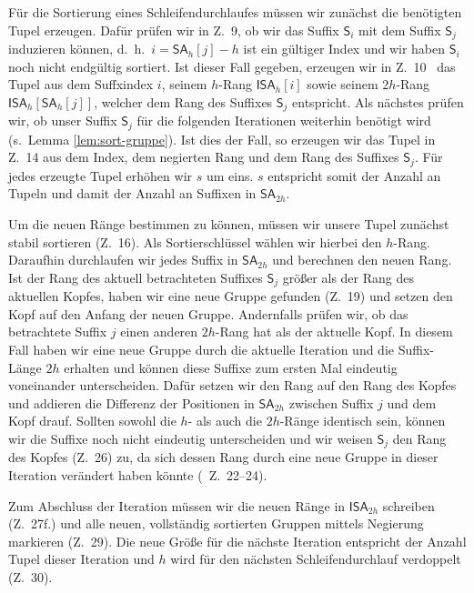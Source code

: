 Für die Sortierung eines Schleifendurchlaufes müssen wir zunächst die benötigten Tupel erzeugen. Dafür prüfen wir in Z.~9, ob wir das Suffix $\mathsf{S}_i$ mit dem Suffix $\mathsf{S}_j$ induzieren können, d.~h.\ $i = \mathsf{SA}_{h}[j]-h$ ist ein gültiger Index und wir haben $\mathsf{S}_i$ noch nicht endgültig sortiert. Ist dieser Fall gegeben, erzeugen wir in Z.~10 \ das Tupel aus dem Suffxindex $i$, seinem $h$-Rang $\mathsf{ISA}_h[i]$ sowie seinem $2h$-Rang $\mathsf{ISA}_h[\mathsf{SA}_h[j]]$, welcher dem Rang des Suffixes $\mathsf{S}_j$ entspricht. Als nächstes prüfen wir, ob unser Suffix $\mathsf{S}_j$ für die folgenden Iterationen weiterhin benötigt wird (s.~Lemma \ref{lem:sort-gruppe}). Ist dies der Fall, so erzeugen wir das Tupel in Z.~14 aus dem Index, dem negierten Rang und dem Rang des Suffixes $\mathsf{S}_j$. Für jedes erzeugte Tupel erhöhen wir $s$ um eins. $s$ entspricht somit der Anzahl an Tupeln und damit der Anzahl an Suffixen in $\mathsf{SA}_{2h}$.

Um die neuen Ränge bestimmen zu können, müssen wir unsere Tupel zunächst stabil sortieren (Z.~16). Als Sortierschlüssel wählen wir hierbei den $h$-Rang. Daraufhin durchlaufen wir jedes Suffix in $\mathsf{SA}_{2h}$ und berechnen den neuen Rang. Ist der Rang des aktuell betrachteten Suffixes $\mathsf{S}_j$ größer als der Rang des aktuellen Kopfes, haben wir eine neue Gruppe gefunden (Z.~19) und setzen den Kopf auf den Anfang der neuen Gruppe. Andernfalls prüfen wir, ob das betrachtete Suffix $j$ einen anderen $2h$-Rang hat als der aktuelle Kopf. In diesem Fall haben wir eine neue Gruppe durch die aktuelle Iteration und die Suffix-Länge $2h$ erhalten und können diese Suffixe zum ersten Mal eindeutig voneinander unterscheiden. Dafür setzen wir den Rang auf den Rang des Kopfes und addieren die Differenz der Positionen in $\mathsf{SA}_{2h}$ zwischen Suffix $j$ und dem Kopf drauf. Sollten sowohl die $h$- als auch die $2h$-Ränge identisch sein, können wir die Suffixe noch nicht eindeutig unterscheiden und wir weisen $\mathsf{S}_j$ den Rang des Kopfes (Z.~26) zu, da sich dessen Rang durch eine neue Gruppe in dieser Iteration verändert haben könnte (~Z.~22--24).

Zum Abschluss der Iteration müssen wir die neuen Ränge in $\mathsf{ISA}_{2h}$ schreiben (Z.~27f.) und alle neuen, vollständig sortierten Gruppen mittels Negierung markieren (Z.~29). Die neue Größe für die nächste Iteration entspricht der Anzahl Tupel dieser Iteration und $h$ wird für den nächsten Schleifendurchlauf verdoppelt (Z.~30).

